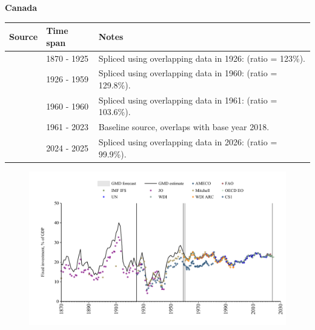 \documentclass[12pt,a4paper,landscape]{article}
\begin{document}
\begin{adjustbox}{max totalsize={\paperwidth}{\paperheight},center}
\begin{minipage}[t][\textheight][t]{\textwidth}
\vspace*{0.5cm}
{}
\begin{center}
{\Large\bfseries Canada}
\end{center}
\vspace{0.5cm}
\begin{table}[H]
\centering
\small
\begin{tabular}{|l|l|l|}
\hline
\textbf{Source} & \textbf{Time span} & \textbf{Notes} \\
\hline
\rowcolor{white}\cite{JO}& 1870 - 1925 &Spliced using overlapping data in 1926: (ratio = 123\%).\\
\rowcolor{lightgray}\cite{CS1_CAN}& 1926 - 1959 &Spliced using overlapping data in 1960: (ratio = 129.8\%).\\
\rowcolor{white}\cite{WDI_ARC}& 1960 - 1960 &Spliced using overlapping data in 1961: (ratio = 103.6\%).\\
\rowcolor{lightgray}\cite{WDI}& 1961 - 2023 &Baseline source, overlaps with base year 2018.\\
\rowcolor{white}\cite{OECD_EO}& 2024 - 2025 &Spliced using overlapping data in 2026: (ratio = 99.9\%).\\
\hline
\end{tabular}
\end{table}
\begin{figure}[H]
\centering
\includegraphics[width=\textwidth,height=0.6\textheight,keepaspectratio]{graphs/CAN_finv_GDP.pdf}
\end{figure}
\end{minipage}
\end{adjustbox}
\end{document}
